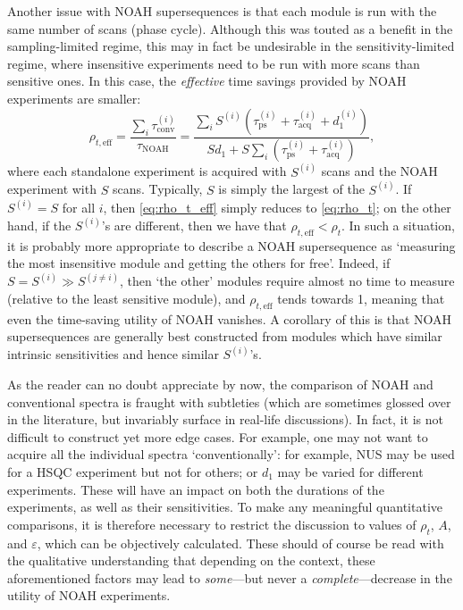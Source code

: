 Another issue with NOAH supersequences is that each module is run with the same number of scans (phase cycle).
Although this was touted as a benefit in the sampling-limited regime, this may in fact be undesirable in the sensitivity-limited regime, where insensitive experiments need to be run with more scans than sensitive ones.
In this case, the \textit{effective} time savings provided by NOAH experiments are smaller:
\begin{equation}
    \label{eq:rho_t_eff}
    \rho_{t,\text{eff}}
    = \frac{\sum_i \tau_\text{conv}^{(i)}}{\tau_\text{NOAH}}
    = \frac{{\sum_i S^{(i)}(\tau_\text{ps}^{(i)} + \tau_\text{acq}^{(i)} + d_1^{(i)})}}{Sd_1 + S\sum_i (\tau_\text{ps}^{(i)} + \tau_\text{acq}^{(i)})},
\end{equation}
where each standalone experiment is acquired with $S^{(i)}$ scans and the NOAH experiment with $S$ scans.
Typically, $S$ is simply the largest of the $S^{(i)}$.
If $S^{(i)} = S$ for all $i$, then \cref{eq:rho_t_eff} simply reduces to \cref{eq:rho_t}; on the other hand, if the $S^{(i)}$'s are different, then we have that $\rho_{t,\text{eff}} < \rho_t$.
In such a situation, it is probably more appropriate to describe a NOAH supersequence as `measuring the most insensitive module and getting the others for free'.
Indeed, if $S = S^{(i)} \gg S^{(j\neq i)}$, then `the other' modules require almost no time to measure (relative to the least sensitive module), and $\rho_{t,\text{eff}}$ tends towards 1, meaning that even the time-saving utility of NOAH vanishes.
A corollary of this is that NOAH supersequences are generally best constructed from modules which have similar intrinsic sensitivities and hence similar $S^{(i)}$'s.

As the reader can no doubt appreciate by now, the comparison of NOAH and conventional spectra is fraught with subtleties (which are sometimes glossed over in the literature, but invariably surface in real-life discussions).
In fact, it is not difficult to construct yet more edge cases.
For example, one may not want to acquire all the individual spectra `conventionally': for example, NUS may be used for a HSQC experiment but not for others; or $d_1$ may be varied for different experiments.
These will have an impact on both the durations of the experiments, as well as their sensitivities.
To make any meaningful quantitative comparisons, it is therefore necessary to restrict the discussion to values of $\rho_t$, $A$, and $\varepsilon$, which can be objectively calculated.
These should of course be read with the qualitative understanding that depending on the context, these aforementioned factors may lead to \textit{some}---but never a \textit{complete}---decrease in the utility of NOAH experiments.

